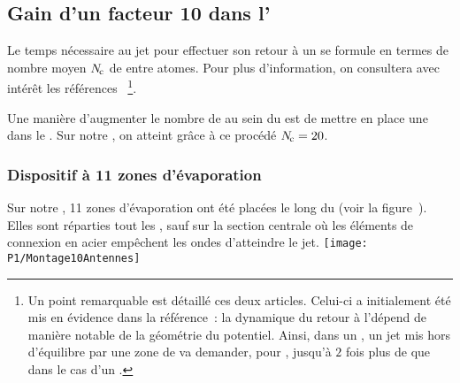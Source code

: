 \subsection{Gain d'un facteur 10 dans l'\edpup}\label{sec:Gain10}
\noindent {} 
Le temps nécessaire au jet pour effectuer son retour à un \eqthdy se formule en termes de nombre moyen ${N_{\hspace{-1pt}\rm c}}$ de \colels entre atomes. Pour plus d'information, on consultera avec intérêt les références~\cite{LaG05,LaG06}%
%
\footnote{Un point remarquable est détaillé ces deux articles. Celui-ci a initialement été mis en évidence dans la référence~\cite{AnG06}: la dynamique du retour à l'\eqthdy dépend de manière notable de la géométrie du potentiel. Ainsi, dans un \pptlin, un jet mis hors d'équilibre par une zone de \firf va demander, pour \rether, jusqu'à $2$ fois plus de \colels que dans le cas d'un \cthar.}. 

Une manière d'augmenter le nombre de \colels au sein du \jat est de mettre en place une \secpent dans le \gm. Sur notre \setup, on atteint grâce à ce procédé ${N_{\hspace{-1pt}\rm c}} = 20$. 

{\AjouteLigne}

\RemonteUnPeuFig
\RemonteUnPeuFig

\subsubsection{Dispositif à 11 zones d'évaporation}
\noindent Sur notre \setup, 11 zones d'évaporation ont été placées le long du \gm (voir la figure~). 
Elles sont réparties tout les , sauf sur la section centrale où les éléments de connexion en acier empêchent les ondes \rf d'atteindre le jet.
%
\RemonteUnPeuFig
\RemonteUnPeuFig
\bfighss
\texttt{[image: P1/Montage10Antennes]}
\label{fig:Montage10Antennes}
\efigh
%

